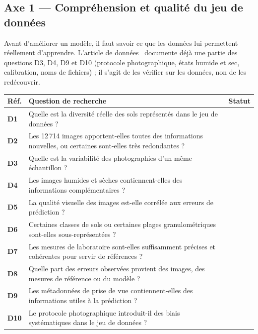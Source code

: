 \documentclass[11pt,a4paper]{article}
\makeatletter
\newenvironment{qtable}{%
  \par\smallskip
  \begin{longtable}{@{}>{\bfseries}p{1.0cm} p{12.3cm} p{1.5cm}@{}}
  \toprule
  \textbf{Réf.} & \textbf{Question de recherche} & \textbf{Statut}\\
  \midrule
  \endhead
}{%
  \bottomrule
  \end{longtable}
}
\makeatother
\begin{document}
\subsection*{Axe 1 --- Compréhension et qualité du jeu de données}
Avant d'améliorer un modèle, il faut savoir ce que les données lui permettent réellement d'apprendre. L'article de données~\cite{plante} documente déjà une partie des questions D3, D4, D9 et D10 (protocole photographique, états humide et sec, calibration, noms de fichiers) ; il s'agit de les vérifier sur les données, non de les redécouvrir.
\begin{qtable}
D1 & Quelle est la diversité réelle des sols représentés dans le jeu de données ? & \\
D2 & Les 12\,714 images apportent-elles toutes des informations nouvelles, ou certaines sont-elles très redondantes ? & \\
D3 & Quelle est la variabilité des photographies d'un même échantillon ? & \\
D4 & Les images humides et sèches contiennent-elles des informations complémentaires ? & \\
D5 & La qualité visuelle des images est-elle corrélée aux erreurs de prédiction ? & \\
D6 & Certaines classes de sols ou certaines plages granulométriques sont-elles sous-représentées ? & \\
D7 & Les mesures de laboratoire sont-elles suffisamment précises et cohérentes pour servir de références ? & \\
D8 & Quelle part des erreurs observées provient des images, des mesures de référence ou du modèle ? & \\
D9 & Les métadonnées de prise de vue contiennent-elles des informations utiles à la prédiction ? & \\
D10 & Le protocole photographique introduit-il des biais systématiques dans le jeu de données ? & \\
\end{qtable}
\end{document}
